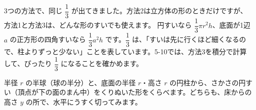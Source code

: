 3つの方法で、同じ $\dfrac{1}{3}$ が出てきました。方法2は立方体の形のときだけですが、方法1と方法3は、どんな形のすいでも使えます。
\noindent 円すいなら $\dfrac{1}{3}\pi r^2h$、底面が1辺 $a$ の正方形の四角すいなら $\dfrac{1}{3}a^2h$ です。$\dfrac{1}{3}$ は、「すいは先に行くほど細くなるので、柱よりずっと少ない」ことを表しています。5-10では、方法3を積分で計算して、ぴったり $\dfrac{1}{3}$ になることを確かめます。

\label{bk:4-5:kyuu}
半径 $r$ の半球（球の半分）と、底面の半径 $r$・高さ $r$ の円柱から、さかさの円すい（頂点が下の面のまん中）をくりぬいた形をくらべます。どちらも、床からの高さ $y$ の所で、水平にうすく切ってみます。

